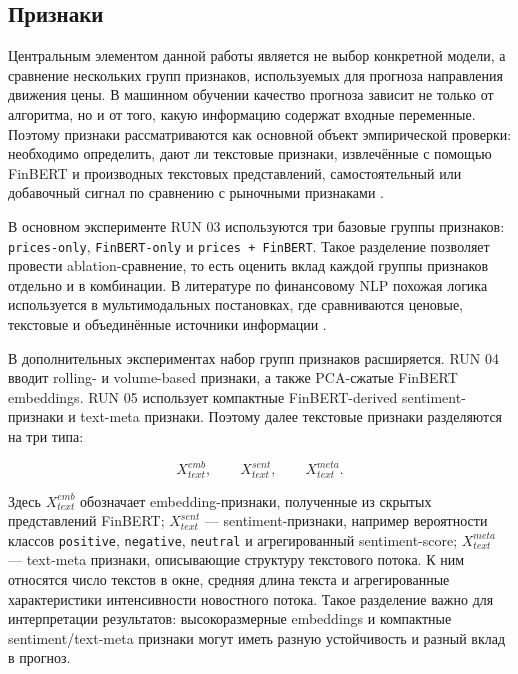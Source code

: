 \subsection{Признаки}

Центральным элементом данной работы является не выбор конкретной модели, а сравнение нескольких групп признаков, используемых для прогноза направления движения цены. В машинном обучении качество прогноза зависит не только от алгоритма, но и от того, какую информацию содержат входные переменные. Поэтому признаки рассматриваются как основной объект эмпирической проверки: необходимо определить, дают ли текстовые признаки, извлечённые с помощью FinBERT и производных текстовых представлений, самостоятельный или добавочный сигнал по сравнению с рыночными признаками \cite{guyon2003feature}.

В основном эксперименте RUN 03 используются три базовые группы признаков: \texttt{prices-only}, \texttt{FinBERT-only} и \texttt{prices + FinBERT}. Такое разделение позволяет провести ablation-сравнение, то есть оценить вклад каждой группы признаков отдельно и в комбинации. В литературе по финансовому NLP похожая логика используется в мультимодальных постановках, где сравниваются ценовые, текстовые и объединённые источники информации \cite{hiew2019bert,zou2022prebit,albada2025bertweet}.

В дополнительных экспериментах набор групп признаков расширяется. RUN 04 вводит rolling- и volume-based признаки, а также PCA-сжатые FinBERT embeddings. RUN 05 использует компактные FinBERT-derived sentiment-признаки и text-meta признаки. Поэтому далее текстовые признаки разделяются на три типа:

\[
X_{text}^{emb}, \qquad X_{text}^{sent}, \qquad X_{text}^{meta}.
\]

Здесь $X_{text}^{emb}$ обозначает embedding-признаки, полученные из скрытых представлений FinBERT; $X_{text}^{sent}$ --- sentiment-признаки, например вероятности классов \texttt{positive}, \texttt{negative}, \texttt{neutral} и агрегированный sentiment-score; $X_{text}^{meta}$ --- text-meta признаки, описывающие структуру текстового потока. К ним относятся число текстов в окне, средняя длина текста и агрегированные характеристики интенсивности новостного потока. Такое разделение важно для интерпретации результатов: высокоразмерные embeddings и компактные sentiment/text-meta признаки могут иметь разную устойчивость и разный вклад в прогноз.

